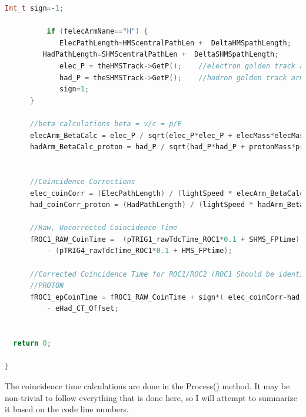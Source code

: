 \documentclass[14pt]{article}
\begin{document}
\begin{lstlisting}[language=C++, caption={THcCoinTime.cxx, The Process() Method}]
          Int_t sign=-1;

          if (felecArmName=="H") {
             ElecPathLength=HMScentralPathLen +  DeltaHMSpathLength;
	     HadPathLength=SHMScentralPathLen +  DeltaSHMSpathLength;
             elec_P = theHMSTrack->GetP();    //electron golden track arm momentum
             had_P = theSHMSTrack->GetP();    //hadron golden track arm momentum
             sign=1;
	  }

	  //beta calculations beta = v/c = p/E
	  elecArm_BetaCalc = elec_P / sqrt(elec_P*elec_P + elecMass*elecMass);
	  hadArm_BetaCalc_proton = had_P / sqrt(had_P*had_P + protonMass*protonMass);


	  //Coincidence Corrections
	  elec_coinCorr = (ElecPathLength) / (lightSpeed * elecArm_BetaCalc );
	  had_coinCorr_proton = (HadPathLength) / (lightSpeed * hadArm_BetaCalc_proton );

	  //Raw, Uncorrected Coincidence Time
	  fROC1_RAW_CoinTime =  (pTRIG1_rawTdcTime_ROC1*0.1 + SHMS_FPtime)
          - (pTRIG4_rawTdcTime_ROC1*0.1 + HMS_FPtime);

	  //Corrected Coincidence Time for ROC1/ROC2 (ROC1 Should be identical to ROC2)
	  //PROTON
	  fROC1_epCoinTime = fROC1_RAW_CoinTime + sign*( elec_coinCorr-had_coinCorr_proton)
          - eHad_CT_Offset;    
  
  
  return 0;

}
\end{lstlisting}
The coincidence time calculations are done in the Process() method. It may be
non-trivial to follow everything that is done here, so I will attempt to summarize
it based on the code line numbers.
\end{document}
